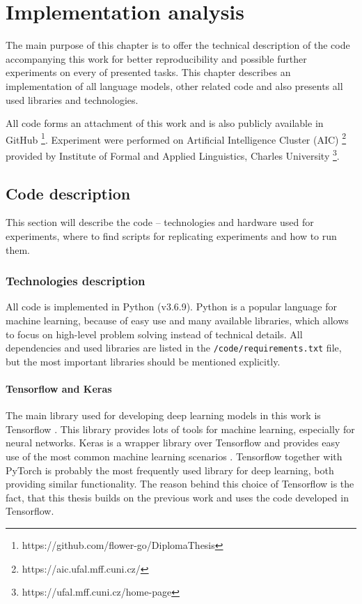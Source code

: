 \chapter{Implementation analysis}
\label{chap:impl}
The main purpose of this chapter is to offer the technical description of the code accompanying this work for better reproducibility and possible further experiments on every of presented tasks. This chapter describes an implementation of all language models, other related code and also presents all used libraries and technologies.
\par
All code forms an attachment of this work and is also publicly available in GitHub \footnote{https://github.com/flower-go/DiplomaThesis}. Experiment were performed on Artificial Intelligence Cluster (AIC) \footnote{https://aic.ufal.mff.cuni.cz/} provided by Institute of Formal and Applied Linguistics, Charles University \footnote{https://ufal.mff.cuni.cz/home-page}.

\section{Code description}
This section will describe the code -- technologies and hardware used for experiments, where to find scripts for replicating experiments and how to run them.
\subsection{Technologies description}
All code is implemented in Python (v3.6.9). Python is a popular language for machine learning, because of easy use and many available libraries, which allows to focus on high-level problem solving instead of technical details. All dependencies and used libraries are listed in the \texttt{/code/requirements.txt} file, but the most important libraries should be mentioned explicitly.
\subsubsection{Tensorflow and Keras}
The main library used for developing deep learning models in this work is Tensorflow \citep{tensorflow2015-whitepaper}. This library provides lots of tools for machine learning, especially for neural networks. Keras is a wrapper library over Tensorflow and provides easy use of the most common machine learning scenarios \citep{keras}. Tensorflow together with PyTorch \citep{NEURIPS2019_9015} is probably the most frequently used library for deep learning, both providing similar functionality. The reason behind this choice of Tensorflow is the fact, that this thesis builds on the previous work and uses the code developed in Tensorflow.
